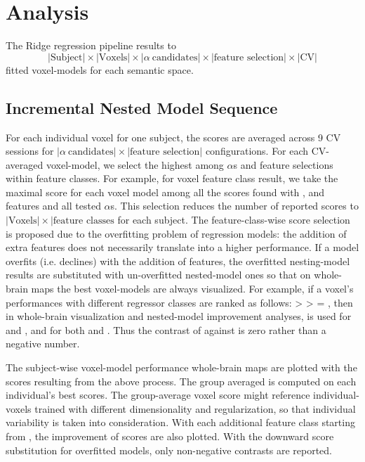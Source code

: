 \section{Analysis}

The Ridge regression pipeline results to \[ \lvert \text{Subject} \rvert \times \lvert \text{Voxels} \rvert \times \lvert \alpha~\text{candidates} \rvert \times \lvert \text{feature selection} \rvert \times \lvert \text{CV} \rvert \] fitted voxel-models for each semantic space. 


\subsection{Incremental Nested Model Sequence}

For each individual voxel for one subject, the  scores are averaged across 9 CV sessions for \( \lvert \alpha~\text{candidates} \rvert \times \lvert \text{feature selection} \rvert \) configurations. For each CV-averaged voxel-model, we select the highest  among \(\alpha\)s and feature selections within feature classes. For example, for voxel   feature class result, we take the maximal  score for each voxel  model among all the scores found with ,  and  features and all tested \(\alpha\)s. This selection reduces the number of reported scores to \( \lvert \text{Voxels} \rvert \times \lvert \text{feature classes} \) for each subject. The feature-class-wise score selection is proposed due to the overfitting problem of regression models: the addition of extra features does not necessarily translate into a higher performance. If a model overfits (i.e.  declines) with the addition of features, the overfitted nesting-model results are substituted with un-overfitted nested-model ones so that on whole-brain maps the best voxel-models are always visualized. For example, if a voxel's  performances with different regressor classes are ranked as follows:  >  >  = , then in whole-brain visualization and nested-model improvement analyses,   is used for  and , and   for both  and . Thus the contrast of  against  is zero rather than a negative number.

The subject-wise voxel-model performance whole-brain maps are plotted with the scores resulting from the above process. The group averaged is computed on each individual's best scores. The group-average voxel score might reference individual-voxels trained with different dimensionality and regularization, so that individual variability is taken into consideration. With each additional feature class starting from , the improvement of  scores are also plotted. With the downward score substitution for overfitted models, only non-negative contrasts are reported. 
 


